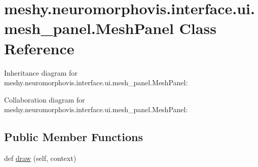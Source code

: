 \hypertarget{classmeshy_1_1neuromorphovis_1_1interface_1_1ui_1_1mesh__panel_1_1MeshPanel}{}\section{meshy.\+neuromorphovis.\+interface.\+ui.\+mesh\+\_\+panel.\+Mesh\+Panel Class Reference}
\label{classmeshy_1_1neuromorphovis_1_1interface_1_1ui_1_1mesh__panel_1_1MeshPanel}


 




Inheritance diagram for meshy.\+neuromorphovis.\+interface.\+ui.\+mesh\+\_\+panel.\+Mesh\+Panel\+:


Collaboration diagram for meshy.\+neuromorphovis.\+interface.\+ui.\+mesh\+\_\+panel.\+Mesh\+Panel\+:
\subsection*{Public Member Functions}
\begin{DoxyCompactItemize}
\item 
def \hyperlink{classmeshy_1_1neuromorphovis_1_1interface_1_1ui_1_1mesh__panel_1_1MeshPanel_a080f5b559ba618d69497d8ebabed67eb}{draw} (self, context)
\end{DoxyCompactItemize}
